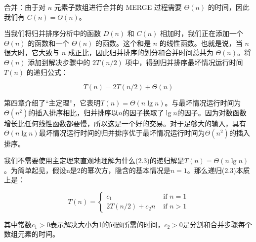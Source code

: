 \documentclass[lang=cn,newtx,10pt,scheme=chinese]{elegantbook}
\begin{document}
合并：由于对 $n$ 元素子数组进行合并的 MERGE 过程需要 $\Theta(n)$ 的时间，因此我们有 $C(n)=\Theta(n)$。

当我们将归并排序分析中的函数 $D(n)$ 和 $C(n)$ 相加时，我们正在添加一个 $\Theta(n)$ 的函数和一个 $\Theta(n)$ 的函数。这个和是 $n$ 的线性函数。也就是说，当 $n$ 很大时，它大致与 $n$ 成正比，因此归并排序的划分和合并时间总共为 $\Theta(n)$。将 $\Theta(n)$ 添加到解决步骤中的 $2T(n/2)$ 项中，得到归并排序最坏情况运行时间 $T(n)$ 的递归公式：

\begin{equation}
T(n)=2T(n/2)+\Theta(n)
\end{equation}

第四章介绍了“主定理”，它表明$T(n)=\Theta(n\lg{n})$。与最坏情况运行时间为$\Theta(n^2)$的插入排序相比，归并排序以$n$的因子换取了$\lg n$的因子。因为对数函数增长比任何线性函数都要慢，所以这是一个好的交易。对于足够大的输入，具有$\Theta(n \lg n)$最坏情况运行时间的归并排序优于最坏情况运行时间为$\Theta(n^2)$的插入排序。

我们不需要使用主定理来直观地理解为什么(2.3)的递归解是$T(n) = \Theta(n \lg n)$。为简单起见，假设n是2的幂次方，隐含的基本情况是$n = 1$。那么递归(2.3)本质上是：

\begin{equation}
T(n)= \begin{cases}c_1 & \text { if } n=1 \\ 2 T(n / 2)+c_2 n & \text { if } n>1\end{cases}
\end{equation}

其中常数$c_1 > 0$表示解决大小为1的问题所需的时间，$c_2 > 0$是分割和合并步骤每个数组元素的时间。
\end{document}
